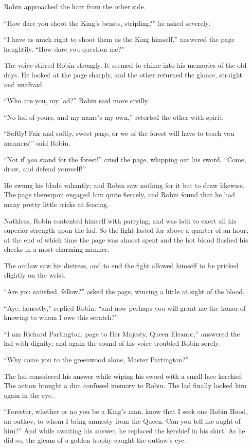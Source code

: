Robin approached the hart from the other side.

``How dare you shoot the King's beasts, stripling?'' he asked severely.

``I have as much right to shoot them as the King himself,'' answered the
page haughtily. ``How dare you question me?''

The voice stirred Robin strongly. It seemed to chime into his memories
of the old days. He looked at the page sharply, and the other returned
the glance, straight and unafraid.

``Who are you, my lad?'' Robin said more civilly.

``No lad of yours, and my name's my own,'' retorted the other with
spirit.

``Softly! Fair and softly, sweet page, or we of the forest will have to
teach you manners!'' said Robin.

``Not if \emph{you} stand for the forest!'' cried the page, whipping out
his sword. ``Come, draw, and defend yourself!''

He swung his blade valiantly; and Robin saw nothing for it but to draw
likewise. The page thereupon engaged him quite fiercely, and Robin found
that he had many pretty little tricks at fencing.

Nathless, Robin contented himself with parrying, and was loth to exert
all his superior strength upon the lad. So the fight lasted for above a
quarter of an hour, at the end of which time the page was almost spent
and the hot blood flushed his cheeks in a most charming manner.

The outlaw saw his distress, and to end the fight allowed himself to be
pricked slightly on the wrist.

``Are you satisfied, fellow?'' asked the page, wincing a little at sight
of the blood.

``Aye, honestly,'' replied Robin; ``and now perhaps you will grant me
the honor of knowing to whom I owe this scratch?''

``I am Richard Partington, page to Her Majesty, Queen Eleanor,''
answered the lad with dignity; and again the sound of his voice troubled
Robin sorely.

``Why come you to the greenwood alone, Master Partington?''

The lad considered his answer while wiping his sword with a small lace
kerchief. The action brought a dim confused memory to Robin. The lad
finally looked him again in the eye.

``Forester, whether or no you be a King's man, know that I seek one
Robin Hood, an outlaw, to whom I bring amnesty from the Queen. Can you
tell me aught of him?'' And while awaiting his answer, he replaced the
kerchief in his shirt. As he did so, the gleam of a golden trophy caught
the outlaw's eye.

